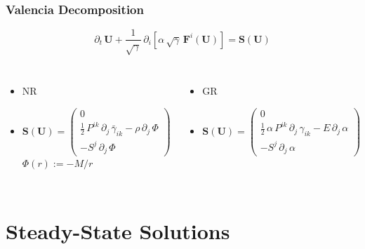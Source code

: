 \documentclass{beamer}
\newcommand{\p}{\partial}
\newcommand{\bs}{\boldsymbol}
\begin{document}
\begin{frame}
\frametitle{Valencia Decomposition}

  \begin{equation*}
    \p_{t}\,\bs{U}
    +\frac{1}{\sqrt{\gamma}}\,
    \p_{i}\left[\alpha\,\sqrt{\gamma}\,\bs{F}^{i}\left(\bs{U}\right)\right]
    =\bs{S}\left(\bs{U}\right)
  \end{equation*}

\Fontvi

  \begin{columns}[c]


      \begin{itemize}
        \item[]
          NR
        \item[]
          $\bs{S}\left(\bs{U}\right)=
          \begin{pmatrix}
          0 \\[1em]
          \frac{1}{2}\,P^{ik}\,\p_{j}\,\bar{\gamma}_{ik}
            -\rho\,\p_{j}\,\Phi \\[1em]
          -S^{j}\,\p_{j}\,\Phi
          \end{pmatrix}$
          $\Phi\left(r\right):=-M/r$
      \end{itemize}


      \begin{itemize}
        \item[]
          GR
        \item[]
          $\bs{S}\left(\bs{U}\right)=
          \begin{pmatrix}
          0 \\[1em]
          \frac{1}{2}\,\alpha\,P^{ik}\,\p_{j}\,\gamma_{ik}
            -E\,\p_{j}\,\alpha \\[1em]
          -S^{j}\,\p_{j}\,\alpha
          \end{pmatrix}$
      \end{itemize}

  \end{columns}

\end{frame}

\section{Steady-State Solutions}
\end{document}
